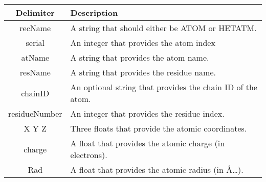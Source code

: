   \begin{tabular}{ c | l  }
    \textbf{Delimiter} & \textbf{Description} \\ \hline
recName 	&	A string that should either be ATOM or HETATM. \\
serial 	&	An integer that provides the atom index \\
atName 	&	A string that provides the atom name.\\
resName	&	A string that provides the residue name. \\
chainID	&	An optional string that provides the chain ID of the atom.\\
residueNumber  & An integer that provides the residue index.\\
X Y Z	& Three floats that provide the atomic coordinates.\\
charge	& A float that provides the atomic charge (in electrons). \\
Rad		& A float that provides the atomic radius (in \AA…).\\
    \hline
  \end{tabular}


\clearpage

